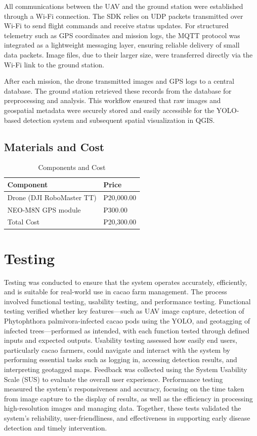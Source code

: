 	All communications between the UAV and the ground station were established through a 
	Wi-Fi connection. The SDK relies on UDP packets transmitted over Wi-Fi to send 
	flight commands and receive status updates. For structured telemetry such as GPS coordinates 
	and mission logs, the MQTT protocol was integrated as a lightweight messaging layer, 
	ensuring reliable delivery of small data packets. Image files, due to their larger size, were 
	transferred directly via the Wi-Fi link to the ground station.  
	
	After each mission, the drone transmitted images and GPS logs to a central database. 
	The ground station retrieved these records from the database for preprocessing 
	and analysis. This workflow ensured that raw images and geospatial metadata were securely 
	stored and easily accessible for the YOLO-based detection system and subsequent 
	spatial visualization in QGIS.
  
  
\subsection{Materials and Cost}

\begin{table}[H]
	\centering
	\caption{Components and Cost}
	\label{tab:components}
	\begin{tabular}{ll}
		\toprule
		Component                 & Price      \\
		\midrule
		Drone (DJI RoboMaster TT) & ₱20,000.00 \\
		\midrule
		NEO-M8N GPS module        & ₱300.00    \\
		\midrule
		Total Cost                & ₱20,300.00 \\
		\bottomrule
	\end{tabular}
\end{table}
	
	\section{Testing} 
	Testing was conducted to ensure that the system operates accurately, efficiently, and is suitable for real-world use in cacao farm management. The process involved functional testing, usability testing, and performance testing. Functional testing verified whether key features—such as UAV image capture, detection of Phytophthora palmivora-infected cacao pods using the YOLO, and geotagging of infected trees—performed as intended, with each function tested through defined inputs and expected outputs. Usability testing assessed how easily end users, particularly cacao farmers, could navigate and interact with the system by performing essential tasks such as logging in, accessing detection results, and interpreting geotagged maps. Feedback was collected using the System Usability Scale (SUS) to evaluate the overall user experience. Performance testing measured the system’s responsiveness and accuracy, focusing on the time taken from image capture to the display of results, as well as the efficiency in processing high-resolution images and managing data. Together, these tests validated the system’s reliability, user-friendliness, and effectiveness in supporting early disease detection and timely intervention.
	

